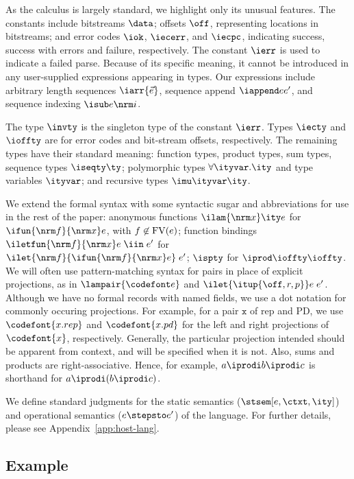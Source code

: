 As the calculus is largely standard, we highlight only its
unusual features. The constants include bitstreams $\data$; offsets $\off$,
representing locations in bitstreams; and error codes $\iok$,
$\iecerr$, and $\iecpc$, indicating success, success with errors and
failure, respectively. The constant $\ierr$ is used to indicate a
failed parse.  Because of its specific meaning, it cannot be introduced in
any user-supplied expressions appearing in \ddc{} types. 
Our expressions include arbitrary length
sequences $\iarr{\vec e}$, sequence append $\iappend e
{e'}$, and sequence indexing $\isub e {\nrm i}$.

The type $\invty$ is the singleton type of the constant $\ierr$.
Types $\iecty$ and $\ioffty$ are for error codes and bit-stream
offsets, respectively. The remaining types have their standard
meaning: function types, product types, sum types, sequence types
$\iseqty \ty$; polymorphic types $\forall \ityvar.\ity$ and type
variables $\ityvar$; and recursive types $\imu \ityvar \ity$.

We extend the formal syntax with some syntactic sugar and
abbreviations for use in the rest of the paper: anonymous functions
$\ilam {\nrm x} \ity e$ for $\ifun {\nrm f} {\nrm x} e$, with $f
\not\in {\rm FV}(e)$; function bindings $\iletfun {\nrm f} {\nrm x} e
\; \iin \; e'$ for $\ilet {\nrm f} {\ifun {\nrm f} {\nrm x} e} \; e'$;
$\ispty$ for $\iprod \ioffty \ioffty$.  We will often use
pattern-matching syntax for pairs in place of explicit projections, as
in $\lampair{\codefont e}$ and $\ilet {\itup{\off,r,p}} e\; e'$.  Although
we have no formal records with named fields, we use a dot notation for
commonly occuring projections. For example, for a pair $\mathtt x$ of
rep and PD, we use $\codefont{x.rep}$ and $\codefont{x.pd}$ for the
left and right projections of $\codefont{x}$, respectively. Generally,
the particular projection intended should be apparent from context,
and will be specified when it is not. Also, sums and products are
right-associative. Hence, for example, $a \iprodi b \iprodi c$ is
shorthand for $a \iprodi (b \iprodi c)$.

We define standard judgments for the static semantics
($\stsem[e,{\ctxt},\ity]$) and operational semantics ($e
\stepsto e'$) of the \implang{} language. For further details, please
see Appendix~\ref{app:host-lang}.

\subsection{Example}
\label{sec:ddc-example}

